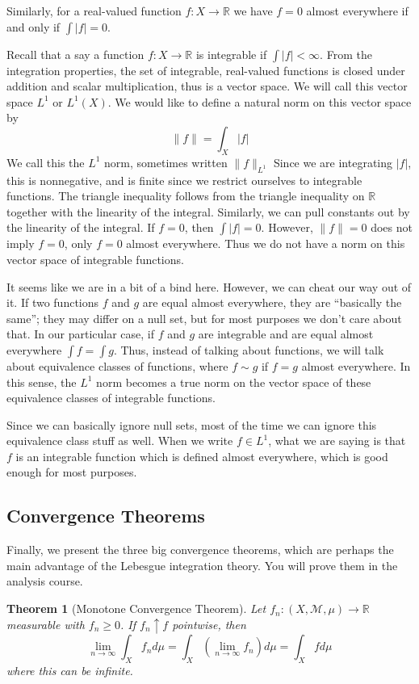 \documentclass[12pt]{amsart}         %
\newtheorem{theorem}{Theorem}[section]
\theoremstyle{remark}
\newcommand{\R}{\mathbb{R}}
\begin{document}
Similarly, for a real-valued function $f:X \rightarrow \R$ we have $f = 0$ almost everywhere if and only if $\int |f| = 0$.

Recall that a say a function $f:X \rightarrow \R$ is integrable if $\int |f| < \infty$. From the integration properties, the set of integrable, real-valued functions is closed under addition and scalar multiplication, thus is a vector space. We will call this vector space $L^1$ or $L^1(X)$. We would like to define a natural norm on this vector space by
\[
\|f\| = \int_X |f|
\]
We call this the $L^1$ norm, sometimes written $\|f\|_{L^1}$
Since we are integrating $|f|$, this is nonnegative, and is finite since we restrict ourselves to integrable functions. The triangle inequality follows from the triangle inequality on $\R$ together with the linearity of the integral. Similarly, we can pull constants out by the linearity of the integral. If $f = 0$, then $\int |f| = 0$. However, $\|f\| = 0$ does not imply $f = 0$, only $f = 0$ almost everywhere. Thus we do not have a norm on this vector space of integrable functions.

It seems like we are in a bit of a bind here. However, we can cheat our way out of it. If two functions $f$ and $g$ are equal almost everywhere, they are ``basically the same''; they may differ on a null set, but for most purposes we don't care about that. In our particular case, if $f$ and $g$ are integrable and are equal almost everywhere $\int f = \int g$. Thus, instead of talking about functions, we will talk about equivalence classes of functions, where $f \sim g$ if $f = g$ almost everywhere. In this sense, the $L^1$ norm becomes a true norm on the vector space of these equivalence classes of integrable functions. 

Since we can basically ignore null sets, most of the time we can ignore this equivalence class stuff as well. When we write $f \in L^1$, what we are saying is that $f$ is an integrable function which is defined almost everywhere, which is good enough for most purposes.

\subsection{Convergence Theorems}

Finally, we present the three big convergence theorems, which are perhaps the main advantage of the Lebesgue integration theory. You will prove them in the analysis course.

\begin{theorem}[Monotone Convergence Theorem]
Let $f_n: (X,\mathcal{M},\mu) \rightarrow \R$ measurable with $f_n \geq 0$. If $f_n \uparrow f$ pointwise, then
\[
\lim_{n\rightarrow \infty} \int_X f_n d\mu = \int_X \left(\lim_{n\rightarrow \infty} f_n\right) d\mu= 
\int_X f d\mu 
\]
where this can be infinite.
\end{theorem}
\end{document}
